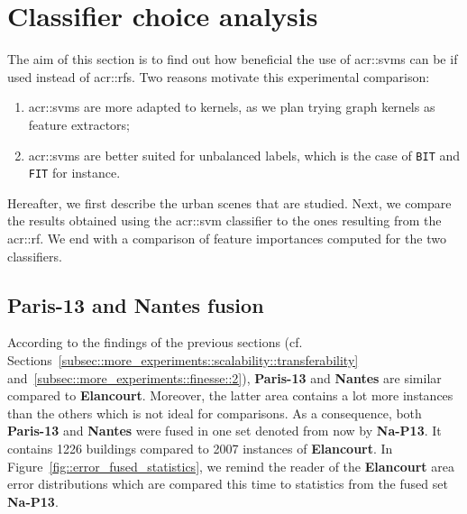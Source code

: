 \minitoc

\vfill

\clearpage

\section{Classifier choice analysis}
    \label{sec::more_experiments::classifier}
    The aim of this section is to find out how beneficial the use of \glspl{acr::svm} can be if used instead of \glspl{acr::rf}.
    Two reasons motivate this experimental comparison:
    \begin{enumerate}[label=\roman*)]
        \item \glspl{acr::svm} are more adapted to kernels, as we plan trying graph kernels as feature extractors;
        \item \glspl{acr::svm} are better suited for unbalanced labels, which is the case of \texttt{BIT} and \texttt{FIT} for instance.
    \end{enumerate}
    Hereafter, we first describe the urban scenes that are studied.
    Next, we compare the results obtained using the \gls{acr::svm} classifier to the ones resulting from the \gls{acr::rf}.
    We end with a comparison of feature importances computed for the two classifiers.

    \subsection{\textbf{Paris-13} and \textbf{Nantes} fusion}
        \label{subsec::more_experiments::classifier::dataset}
        According to the findings of the previous sections (cf. Sections~\ref{subsec::more_experiments::scalability::transferability} and~\ref{subsec::more_experiments::finesse::2}), \textbf{Paris-13} and \textbf{Nantes} are similar compared to \textbf{Elancourt}.
        Moreover, the latter area contains a lot more instances than the others which is not ideal for comparisons.
        As a consequence, both \textbf{Paris-13} and \textbf{Nantes} were fused in one set denoted from now by \textbf{Na-P13}.
        It contains 1226 buildings compared to 2007 instances of \textbf{Elancourt}.
        In Figure~\ref{fig::error_fused_statistics}, we remind the reader of the \textbf{Elancourt} area error distributions which are compared this time to statistics from the fused set \textbf{Na-P13}.\\
    
